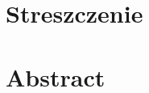 \section*{Streszczenie}
\label{chap:Streszczenie}


\bigskip
\section*{Abstract}
\label{chap:StreszczenieEng}
\bigskip

